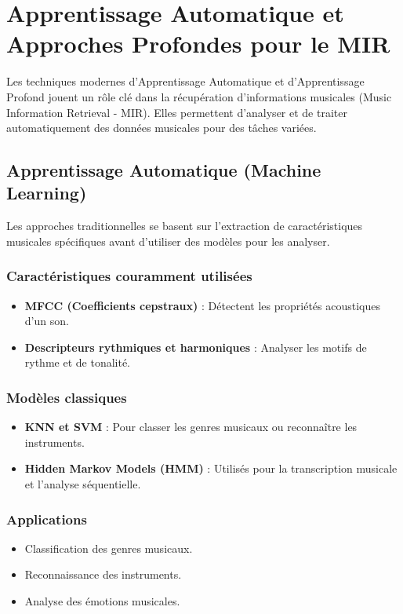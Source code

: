\begin{section}

  \chapter{Apprentissage Automatique et Approches Profondes pour le MIR}

Les techniques modernes d'Apprentissage Automatique et d'Apprentissage Profond jouent un rôle clé dans la récupération d'informations musicales (Music Information Retrieval - MIR). Elles permettent d'analyser et de traiter automatiquement des données musicales pour des tâches variées.

\section{Apprentissage Automatique (Machine Learning)}
Les approches traditionnelles se basent sur l'extraction de caractéristiques musicales spécifiques avant d'utiliser des modèles pour les analyser.
\subsection*{Caractéristiques couramment utilisées}
\begin{itemize}
    \item \textbf{MFCC (Coefficients cepstraux)} : Détectent les propriétés acoustiques d'un son.
    \item \textbf{Descripteurs rythmiques et harmoniques} : Analyser les motifs de rythme et de tonalité.
\end{itemize}

\subsection*{Modèles classiques}
\begin{itemize}
    \item \textbf{KNN et SVM} : Pour classer les genres musicaux ou reconnaître les instruments.
    \item \textbf{Hidden Markov Models (HMM)} : Utilisés pour la transcription musicale et l'analyse séquentielle.
\end{itemize}

\subsection*{Applications}
\begin{itemize}
    \item Classification des genres musicaux.
    \item Reconnaissance des instruments.
    \item Analyse des émotions musicales.
\end{itemize}


\end{section}
